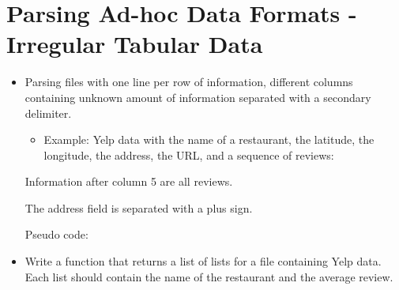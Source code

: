 \documentclass[letterpaper,10pt,english]{sphinxmanual}
\begin{document}
\section{Parsing Ad-hoc Data Formats - Irregular Tabular Data}
\label{\detokenize{lecture_notes/lec13_files_web:parsing-ad-hoc-data-formats-irregular-tabular-data}}\begin{itemize}
\item {} 
Parsing files with one line per row of information, different
columns containing unknown amount of information separated with a
secondary delimiter.
\begin{itemize}
\item {} 
Example: Yelp data with the name of a restaurant, the latitude,
the longitude, the address, the URL, and a sequence of reviews:

\begin{sphinxVerbatim}[commandchars=\\\{\}]
\end{sphinxVerbatim}

\end{itemize}

Information after column 5 are all reviews.

The address field is separated with a plus sign.

Pseudo code:

\begin{sphinxVerbatim}[commandchars=\\\{\}]
     
       
         
         
         
\end{sphinxVerbatim}

\item {} 
 Write a function that returns a list of lists for a file
containing Yelp data. Each list should contain the name of the
restaurant and the average review.

\end{itemize}
\end{document}
